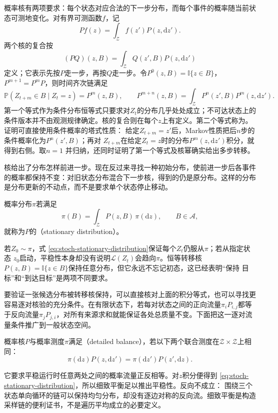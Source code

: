 概率核有两项要求：每个状态对应合法的下一步分布，而每个事件的概率随当前状态可测地变化。对有界可测函数$f$，记
\[
  Pf(z)=\int_{\mathcal{Z}}f(z')P(z,\mathrm{d}z').
\]
两个核的复合按
\[
  (PQ)(z,B)
  =
  \int_{\mathcal{Z}}Q(z',B)P(z,\mathrm{d}z')
\]
定义；它表示先按$P$走一步，再按$Q$走一步。令$P^0(z,B)=\mathbb{I}\{z\in B\}$，
$P^{m+1}=P^mP$，则时间齐次链满足
\begin{equation}
  \mathbb{P}(Z_{t+m}\in B\mid Z_t=z)=P^m(z,B),
  \qquad
  P^{m+n}(z,B)
  =
  \int_{\mathcal{Z}}P^n(z',B)P^m(z,\mathrm{d}z').
  \label{eq:stoch-chapman-kolmogorov}
\end{equation}
第一个等式作为条件分布恒等式只要求对\(Z_t\)的分布几乎处处成立；不可达状态上的条件版本并不由观测规律确定。核的复合则在每个\(z\)上有定义。第二个等式称为。证明可直接使用条件概率的塔式性质：
给定$Z_{t+m}=z'$后，Markov性质把后$n$步的条件概率化为$P^n(z',B)$；再对
$Z_{t+m}$在给定$Z_t=z$时的分布$P^m(z,\mathrm{d}z')$积分，就得到右侧。取$n=1$
并归纳，还同时证明了第一个等式及核幂确实给出多步转移。

核给出了分布怎样前进一步。现在反过来寻找一种初始分布，使前进一步后各事件的概率都保持不变：对旧状态分布混合下一步核，得到的仍是原分布。这样的分布是分布更新的不动点，而不是要求单个状态停止移动。
\begin{definition}[平稳分布]
  \label{def:stoch-stationary-distribution}
概率分布$\pi$若满足
\begin{equation}
  \pi(B)=\int_{\mathcal{Z}}P(z,B)\,\pi(\mathrm{d}z),
  \qquad B\in\mathcal{A},
  \label{eq:stoch-stationary-distribution}
\end{equation}
就称为$P$的（stationary distribution）。
\end{definition}
若$Z_0\sim\pi$，式
\eqref{eq:stoch-stationary-distribution}保证每个$Z_t$仍服从$\pi$；若从指定状态
$z_0$启动，平稳性本身却没有说明$\mathcal{L}(Z_t)$会趋向$\pi$。恒等转移核
$P(z,B)=\mathbb{I}\{z\in B\}$保持任意分布，但它永远不忘记初态，这已经表明“保持
目标”和“到达目标”是两项不同要求。

要验证一张候选分布被转移核保持，可以直接核对上面的积分等式，也可以寻找更容易逐对核验的充分条件。在有限状态下，若每对状态之间的正向流量\(\pi_iP_{i,j}\)都等于反向流量\(\pi_jP_{j,i}\)，对所有来源求和就能保证各处总质量不变。下面把这一逐对流量条件推广到一般状态空间。
\begin{definition}[细致平衡]
  \label{def:stoch-detailed-balance}
概率核\(P\)与概率测度\(\pi\)满足（detailed balance），若以下两个联合测度在\(\mathcal Z\times\mathcal Z\)上相同：
\begin{equation}
  \pi(\mathrm{d}z)P(z,\mathrm{d}z')
  =\pi(\mathrm{d}z')P(z',\mathrm{d}z).
  \label{eq:stoch-detailed-balance}
\end{equation}
\end{definition}
它要求平稳运行时任意两处之间的概率流量正反相等。对$z$积分便得到
\eqref{eq:stoch-stationary-distribution}，所以细致平衡足以推出平稳性。反向不成立：
围绕三个状态单向循环的链可以保持均匀分布，却没有逐边对称的反向流。细致平衡是构造
采样链的便利证书，不是遍历平均成立的必要定义。

